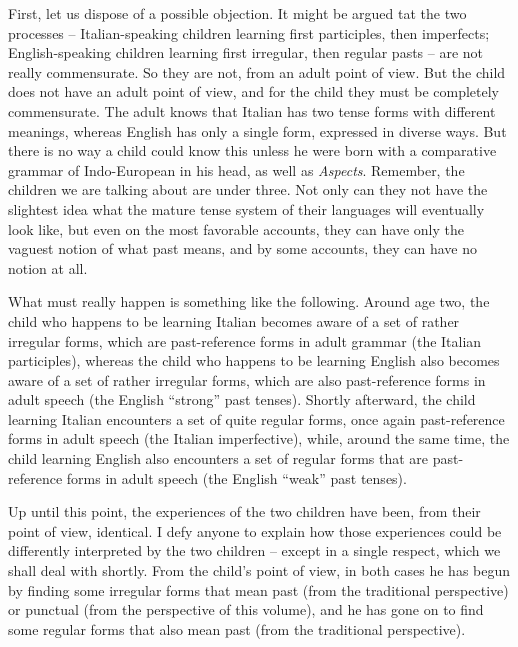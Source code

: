 First, let us dispose of a possible objection. It might be argued tat the two processes -- Italian-speaking children learning first parti\-ciples, then imperfects; English-speaking children learning first irregular, then regular pasts -- are not really commensurate. So they are not, from an adult point of view. But the child does not have an adult point of view, and for the child they must be completely commensurate. The adult knows that Italian has two tense forms with different meanings, whereas English has only a single form, expressed in diverse ways. But there is no way a child could know this unless he were born with a comparative grammar of Indo-European in his head, as well as \textit{Aspects}. Remember, the children we are talking about are under three. Not only can they not have the slightest idea what the mature tense system of their languages will eventually look like, but even on the most favorable accounts, they can have only the vaguest notion of what past means, and by some accounts, they can have no notion at all.


What must really happen is something like the following. Around age two, the child who happens to be learning Italian becomes aware of a set of rather irregular forms, which are past-reference forms in adult grammar (the Italian participles), whereas the child who happens to be learning English also becomes aware of a set of rather irregular forms, which are also past-reference forms in adult speech (the English ``strong'' past tenses). Shortly afterward, the child learning Italian encounters a set of quite regular forms, once again past-reference forms in adult speech (the Italian imperfective), while, around the same time, the child learning English also encounters a set of regular forms that are past-reference forms in adult speech (the English ``weak'' past tenses).

Up until this point, the experiences of the two children have been, from their point of view, identical. I defy anyone to explain how those experiences could be differently interpreted by the two children -- except in a single respect, which we shall deal with shortly. From the child's point of view, in both cases he has begun by finding some irregular forms that mean past (from the traditional perspective) or punctual (from the perspective of this volume), and he has gone on to find some regular forms that also mean past (from the traditional perspective).

